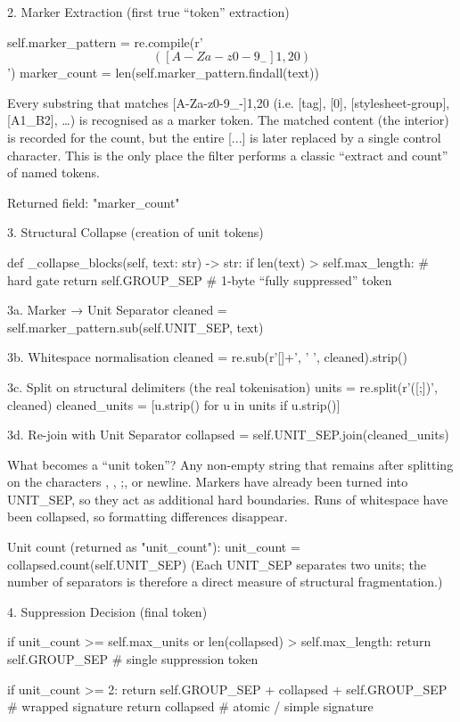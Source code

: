 2. Marker Extraction (first true “token” extraction)

self.marker_pattern = re.compile(r'\[([A-Za-z0-9_-]{1,20})\]')
marker_count = len(self.marker_pattern.findall(text))

Every substring that matches [A-Za-z0-9_-]{1,20} (i.e. [tag], [0], [stylesheet-group], [A1_B2], \ldots) is recognised as a marker token.
The matched content (the interior) is recorded for the count, but the entire [...] is later replaced by a single control character.
This is the only place the filter performs a classic “extract and count” of named tokens.

Returned field: "marker_count"

3. Structural Collapse (creation of unit tokens)

def _collapse_blocks(self, text: str) -> str:
    if len(text) > self.max_length:          # hard gate
        return self.GROUP_SEP                # 1-byte “fully suppressed” token

3a. Marker → Unit Separator
    cleaned = self.marker_pattern.sub(self.UNIT_SEP, text)

3b. Whitespace normalisation
    cleaned = re.sub(r'[\s]+', ' ', cleaned).strip()

3c. Split on structural delimiters (the real tokenisation)
    units = re.split(r'([{};\n])', cleaned)
    cleaned_units = [u.strip() for u in units if u.strip()]

3d. Re-join with Unit Separator
    collapsed = self.UNIT_SEP.join(cleaned_units)

What becomes a “unit token”?
Any non-empty string that remains after splitting on the characters {, }, ;, or newline.
Markers have already been turned into UNIT_SEP, so they act as additional hard boundaries.
Runs of whitespace have been collapsed, so formatting differences disappear.

Unit count (returned as "unit_count"):
unit_count = collapsed.count(self.UNIT_SEP)
(Each UNIT_SEP separates two units; the number of separators is therefore a direct measure of structural fragmentation.)

4. Suppression Decision (final token)

if unit_count >= self.max_units or len(collapsed) > self.max_length:
    return self.GROUP_SEP          # single suppression token

if unit_count >= 2:
    return self.GROUP_SEP + collapsed + self.GROUP_SEP   # wrapped signature
return collapsed                   # atomic / simple signature

